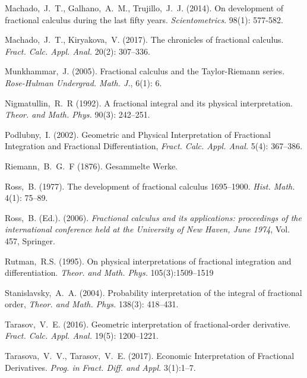 \documentclass{article}
\theoremstyle{theorem}
\theoremstyle{definition}
\begin{document}
\begin{thebibliography}{1}
 Machado,~J.~T., Galhano,~A.~M., Trujillo,~J.~J. (2014). On development of fractional calculus during the last fifty years. \textit{Scientometrics}. 98(1): 577-582.

 Machado,~J.~T., Kiryakova,~V. (2017). The chronicles of fractional calculus. \textit{Fract. Calc. Appl. Anal.} 20(2): 307--336.

 Munkhammar,~J. (2005). Fractional calculus and the Taylor-Riemann series. \textit{Rose-Hulman Undergrad. Math. J.}, 6(1): 6.

 Nigmatullin,~R.~R (1992). A fractional integral and its physical interpretation. \textit{Theor. and Math. Phys.} 90(3): 242--251.

 Podlubny,~I. (2002). Geometric and Physical Interpretation of Fractional Integration and Fractional Differentiation, \textit{Fract. Calc. Appl. Anal.} 5(4): 367--386.

 Riemann,~B.~G.~F (1876). Gesammelte Werke.

 Ross,~B. (1977). The development of fractional calculus 1695--1900. \textit{Hist. Math.} 4(1): 75--89.

 Ross,~B. (Ed.). (2006). \textit{Fractional calculus and its applications: proceedings of the international conference held at the University of New Haven, June 1974}, Vol. 457, Springer.
 
 Rutman,~R.S. (1995). On physical interpretations of fractional integration and differentiation. \textit{Theor. and Math. Phys.} 105(3):1509--1519

 Stanislavsky,~A.~A. (2004).  Probability interpretation of the integral of fractional order, \textit{Theor. and Math. Phys.} 138(3): 418--431.

 Tarasov,~V.~E. (2016). Geometric interpretation of fractional-order derivative. \textit{Fract. Calc. Appl. Anal.} 19(5): 1200--1221.

 Tarasova,~V.~V., Tarasov,~V.~E. (2017). Economic Interpretation of Fractional Derivatives. \textit{Prog. in Fract. Diff. and Appl.} 3(1):1--7. 

\end{thebibliography}
\vfill\eject
\end{document}
